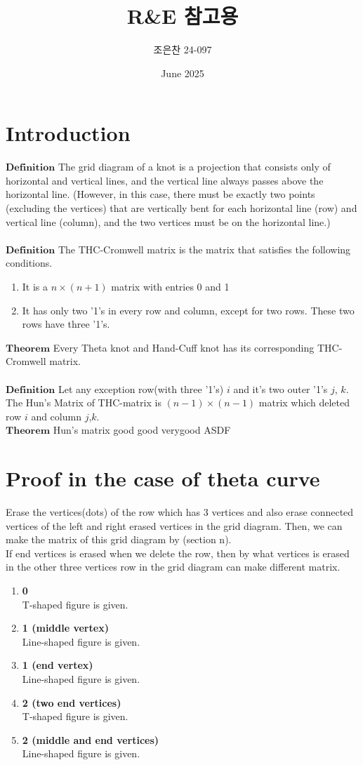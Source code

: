 \documentclass{article}
\title{R\&E 참고용}
\author{조은찬 24-097}
\date{June 2025}
\begin{document}
\maketitle

\section{Introduction}
$\mathbf{Definition}$ The grid diagram of a knot is a projection that consists only of horizontal and vertical lines, and the vertical line always passes above the horizontal line. (However, in this case, there must be exactly two points (excluding the vertices) that are vertically bent for each horizontal line (row) and vertical line (column), and the two vertices must be on the horizontal line.) \\ \\
$\mathbf{Definition}$ The THC-Cromwell matrix is the matrix that satisfies the following conditions.
\begin{enumerate}
    \item It is a $n\times(n+1)$ matrix with entries 0 and 1
    \item It has only two '1's in every row and column, except for two rows. These two rows have three '1's.
\end{enumerate}
$\mathbf{Theorem}$ Every Theta knot and Hand-Cuff knot has its corresponding THC-Cromwell matrix. \\ \\
$\mathbf{Definition}$ Let any exception row(with three '1's) $i$ and it's two outer '1's $j$, $k$. The Hun's Matrix of THC-matrix is $(n-1)\times(n-1)$ matrix which deleted row $i$ and column $j$,$k$.\\
$\mathbf{Theorem}$ 
Hun's matrix good good verygood
ASDF

\section{Proof in the case of theta curve}
Erase the vertices(dots) of the row which has 3 vertices and also erase connected vertices of the left and right erased vertices in the grid diagram. Then, we can make the matrix of this grid diagram by (section n).\\ If end vertices is erased when we delete the row, then by what vertices is erased in the other three vertices row in the grid diagram can make different matrix.
\begin{enumerate}
    \item \textbf{0}\\
    T-shaped figure is given.
    \item \textbf{1 (middle vertex)}\\
    Line-shaped figure is given.
    \item \textbf{1 (end vertex)}\\
    Line-shaped figure is given.
    \item \textbf{2 (two end vertices)}\\
    T-shaped figure is given.
    \item \textbf{2 (middle and end vertices)}\\
    Line-shaped figure is given.
\end{enumerate}
\end{document}
